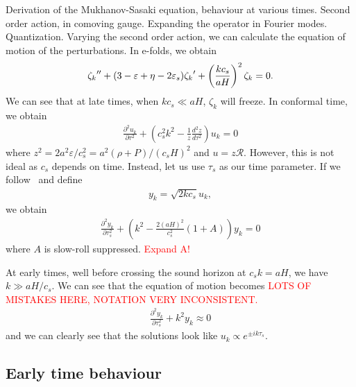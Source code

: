     Derivation of the Mukhanov-Sasaki equation, behaviour at various times.
    Second order action, in comoving gauge.
    Expanding the operator in Fourier modes.
    Quantization.
    Varying the second order action, we can calculate the equation of motion
    of the perturbations.
    In e-folds, we obtain
    \begin{align}\label{modefneqn_zeta_N}
        {\zeta_k}'' + (3-\varepsilon+\eta-2\varepsilon_{s}){\zeta_k}'+\left(\frac{kc_s}{aH}\right)^2\zeta_k=0.
    \end{align}
    We can see that at late times, when $kc_s\ll aH$, $\zeta_k$ will freeze.
    In conformal time, we obtain
    \begin{align}\label{modefneqn_tau}
        \frac{\partial^2 u_k}{\partial \tau^2} + \left(c_s^2k^2 - \frac{1}{z}\frac{d^2 z}{d \tau^2}\right)u_k = 0
    \end{align}
    where $z^2 = 2a^2\varepsilon/c_s^2 = a^2\left(\rho+P\right)/\left(c_sH\right)^2$ and $u=z\mathcal{R}$.
    However, this is not ideal as $c_s$ depends on time.
    Instead, let us use $\tau_s$ as our time parameter.
    If we follow~\cite{Hu_2011} and define
    \begin{align}
        y_k=\sqrt{2kc_s}u_k,
    \end{align}
    we obtain
    \begin{align}\label{modefneqn_tau_s}
        \frac{\partial^2 y_k}{\partial \tau_s^2} + \left(k^2 - \frac{2\left(aH\right)^2}{c_s^2}(1+A)\right)y_k = 0
    \end{align}
    where $A$ is slow-roll suppressed. \textcolor{red}{Expand A!}


    At early times, well before crossing the sound horizon at $c_sk=aH$,
    we have $k\gg aH/c_s$. We can see that the equation of motion becomes
    \textcolor{red}{LOTS OF MISTAKES HERE, NOTATION VERY INCONSISTENT.}
    \begin{align}
        \frac{\partial^2 y_k}{\partial \tau_s^2} + k^2 y_k \approx 0
    \end{align}
    and we can clearly see that the solutions look like $u_k\propto e^{\pm ik\tau_s}$.


    \subsection{Early time behaviour}
